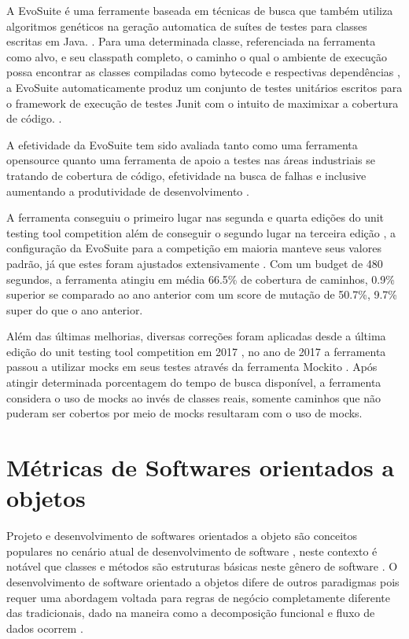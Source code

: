 \documentclass[
	12pt,				%
	oneside,			%
	a4paper,			%
	english,			%
	brazil				%
	]{abntex2ppgsi}
\begin{document}
A EvoSuite \cite{Evosuite} é uma ferramente baseada em técnicas de busca que também utiliza algoritmos genéticos na geração automatica de suítes de testes para classes escritas em Java. \cite{Fraser2017}. Para uma determinada classe, referenciada na ferramenta como alvo, e seu classpath completo, o caminho o qual o ambiente de execução possa encontrar as classes compiladas como bytecode e respectivas dependências \cite{ClassPath}, a EvoSuite automaticamente produz um conjunto de testes unitários escritos para o framework de execução de testes Junit \cite{Junit} com o intuito de maximixar a cobertura de código. \cite{Fraser2017}.

A efetividade da EvoSuite tem sido avaliada tanto como uma ferramenta opensource quanto uma ferramenta de apoio a testes nas áreas industriais se tratando de cobertura de código, efetividade na busca de falhas e inclusive aumentando a produtividade de desenvolvimento \cite{Fraser2017}. 

A ferramenta conseguiu o primeiro lugar nas segunda e quarta edições do unit testing tool competition além de conseguir o segundo lugar na terceira edição \cite{Fraser2017}, a configuração da EvoSuite para a competição em maioria manteve seus valores padrão, já que estes foram ajustados extensivamente \cite{Fraser2017}. Com um budget de 480 segundos, a ferramenta atingiu em média 66.5\% de cobertura de caminhos, 0.9\% superior se comparado ao ano anterior com um score de mutação de 50.7\%, 9.7\% super do que o ano anterior. \cite{Fraser2017}

Além das últimas melhorias, diversas correções foram aplicadas desde a última edição do unit testing tool competition em 2017  \cite{Fraser2017}, no ano de 2017 a ferramenta passou a utilizar mocks em seus testes através da ferramenta Mockito \cite{Mockito} \cite{Fraser2017}. Após atingir determinada porcentagem do tempo de busca disponível, a ferramenta considera o uso de mocks ao invés de classes reais, somente caminhos que não puderam ser cobertos por meio de mocks resultaram com o uso de mocks.  \cite{Fraser2017}


\chapter{Métricas de Softwares orientados a objetos}
\label{chap:metricas}

Projeto e desenvolvimento de softwares orientados a objeto são conceitos populares no cenário atual de desenvolvimento de software \cite{srivastava2013}, neste contexto é notável que classes e métodos são estruturas básicas neste gênero de software \cite{kan95}. O desenvolvimento de software orientado a objetos difere de outros paradigmas pois requer uma abordagem voltada para regras de negócio completamente diferente das tradicionais, dado na maneira como a decomposição funcional e fluxo de dados ocorrem  \cite{srivastava2013}.
\end{document}
